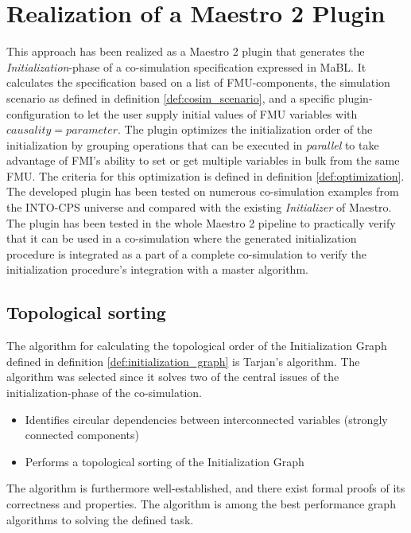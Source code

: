 \documentclass[runningheads]{llncs}
\begin{document}
\section{Realization of a Maestro 2 Plugin}\label{sc:implementation}
This approach has been realized as a Maestro 2 plugin that generates the \textit{Initialization}-phase of a co-simulation specification expressed in MaBL. It calculates the specification based on a list of FMU-components, the simulation scenario as defined in definition \ref{def:cosim_scenario}, and a specific plugin-configuration to let the user supply initial values of FMU variables with $causality=parameter$. The plugin optimizes the initialization order of the initialization by grouping operations that can be executed in \textit{parallel} to take advantage of FMI's ability to set or get multiple variables in bulk from the same FMU. The criteria for this optimization is defined in definition \ref{def:optimization}. 
The developed plugin has been tested on numerous co-simulation examples from the INTO-CPS universe and compared with the existing \textit{Initializer} of Maestro. The plugin has been tested in the whole Maestro 2 pipeline to practically verify that it can be used in a co-simulation where the generated initialization procedure is integrated as a part of a complete co-simulation to verify the initialization procedure's integration with a master algorithm.

\subsection{Topological sorting}
The algorithm for calculating the topological order of the Initialization Graph defined in definition \ref{def:initialization_graph} is Tarjan's algorithm\cite{tarjan_1972}. The algorithm was selected since it solves two of the central issues of the initialization-phase of the co-simulation.
\begin{itemize}
    \item Identifies circular dependencies between interconnected variables (strongly connected components)
    \item Performs a topological sorting of the Initialization Graph
\end{itemize}
The algorithm is furthermore well-established, and there exist formal proofs of its correctness and properties\cite{stefan_merz}. The algorithm is among the best performance graph algorithms to solving the defined task.  
\end{document}

